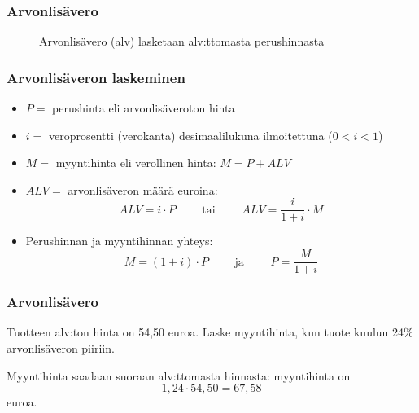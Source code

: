 \documentclass{beamer}
\begin{document}
\begin{frame}
\frametitle{Arvonlisävero}
\pause
\begin{figure}
\caption{Arvonlisävero (alv) lasketaan alv:ttomasta perushinnasta}
\end{figure}
\end{frame}



\begin{frame}
\frametitle{Arvonlisäveron laskeminen}
	\begin{itemize}
		\item \(P =\) perushinta eli arvonlisäveroton hinta
		\item \(i =\) veroprosentti (verokanta) desimaalilukuna ilmoitettuna (\(0 < i < 1\))
		\item \(M =\) myyntihinta eli verollinen hinta: \(M = P + ALV\)
		\item \(ALV =\) arvonlisäveron määrä euroina:
			\[
				ALV = i \cdot P\qquad\text{ tai }\qquad ALV = \frac{i}{1 + i}\cdot M
			\]
		\item Perushinnan ja myyntihinnan yhteys:
			\[
				M = (1 + i) \cdot P \qquad\text{ ja }\qquad P = \frac{M}{1 + i}
			\]
	\end{itemize}
\end{frame}

\begin{frame}
\frametitle{Arvonlisävero}
	\begin{esim}
		Tuotteen alv:ton hinta on 54,50 euroa. Laske myyntihinta, kun tuote kuuluu 24\% arvonlisäveron piiriin.
	\end{esim}
	\pause
	\begin{ratkaisu}
		Myyntihinta saadaan suoraan alv:ttomasta hinnasta: myyntihinta on 			\[
				1,24\cdot 54,50 = 67,58
			\] euroa.
	\end{ratkaisu}
\end{frame}
\end{document}
